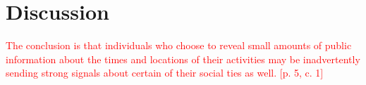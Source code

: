 \section{Discussion}
\textcolor{red}{The conclusion is that individuals who choose to reveal small amounts of public information about the times and locations of their activities may be inadvertently sending strong signals about certain of their social ties as well. [p. 5, c. 1]}